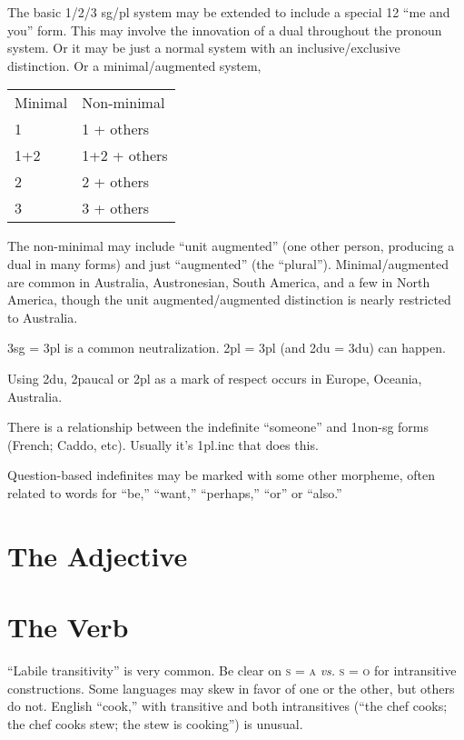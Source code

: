 \documentclass[11pt]{article}
\newcommand{\I}[1]{\textsc{#1}}   %
\begin{document}
The basic 1/2/3 sg/pl system may be extended to include a special 12
``me and you'' form.  This may involve the innovation of a dual
throughout the pronoun system.  Or it may be just a normal system with
an inclusive/exclusive distinction.  Or a minimal/augmented system, 

\begin{center}
\begin{tabular}{ll}
Minimal & Non-minimal \\
1  & 1 + others \\
1+2 & 1+2 + others \\
2 & 2 + others \\
3 & 3 + others 
\end{tabular}
\end{center}

\noindent The non-minimal may include ``unit augmented'' (one other
person, producing a dual in many forms) and just ``augmented'' (the
``plural'').  Minimal/augmented are common in Australia, Austronesian,
South America, and a few in North America, though the unit
augmented/augmented distinction is nearly restricted to Australia.

3sg = 3pl is a common neutralization.  2pl = 3pl (and 2du = 3du) can
happen.

Using 2du, 2paucal or 2pl as a mark of respect occurs in Europe,
Oceania, Australia.

There is a relationship between the indefinite ``someone'' and
1non-sg forms (French; Caddo, etc).  Usually it's 1pl.inc that does
this. 

Question-based indefinites may be marked with some other morpheme,
often related to words for ``be,'' ``want,'' ``perhaps,'' ``or'' or
``also.''


\section{The Adjective}


\section{The Verb}

``Labile transitivity'' is very common.  Be clear on \I{s = a}
\textit{vs.} \I{s = o} for intransitive constructions.  Some languages
may skew in favor of one or the other, but others do not.  English
``cook,'' with transitive and both intransitives (``the chef cooks;
the chef cooks stew; the stew is cooking'') is unusual.
\end{document}
